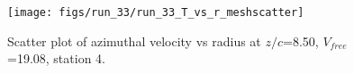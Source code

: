 \begin{figure}[H]
\centering
\texttt{[image: figs/run\_33/run\_33\_T\_vs\_r\_meshscatter]}
\caption{Scatter plot of azimuthal velocity vs radius at $z/c$=8.50, $V_{free}$=19.08, station 4.}
\label{fig:run_33_T_vs_r_meshscatter}
\end{figure}


